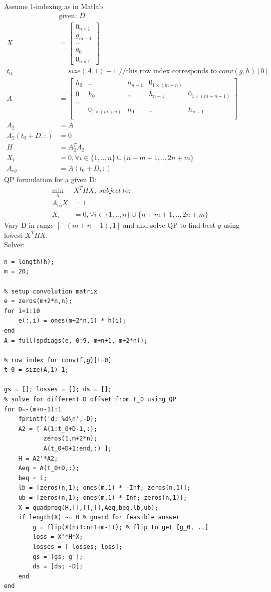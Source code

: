 \documentclass[12pt,letter]{article}
\begin{document}
\begin{enumerate}
\begin{itemize}
    Assume 1-indexing as in Matlab
    \begin{align*}
      &\text{given: } D\\
      X &=
      \begin{bmatrix}
        0_{n\times 1}\\ g_{m-1} \\ .. \\ g_{0}\\0_{n \times 1}
      \end{bmatrix}\\
      t_0 &= size(A,1)-1 \text{ //this row index corresponds to } conv(g,h)[0]\\
      A &=
      \begin{bmatrix}
        h_0 & .. & h_{n-1} & 0_{1 \times (m+n)} & \\
        0 & h_0 & .. & h_{n-1} & 0_{1 \times (m+n-1)} \\
        .. & & & &\\
        & 0_{1\times (m+n)} & h_0 & .. & h_{n-1}\\
      \end{bmatrix}\\
      A_2 &= A\\
      A_2(t_0+D,:) &= 0\\
      H &= A_2^T A_2\\
      X_i &=0, \forall i \in \{1,..,n\} \cup \{n+m+1,..,2n+m\}\\
      A_{eq}&=A(t_0+D,:)
    \end{align*}
    QP formulation for a given D:
    \begin{align*}
      \min_X & X^T H X,\ subject\ to:\\
      A_{eq}X&=1\\
      X_i &=0, \forall i \in \{1,..,n\} \cup \{n+m+1,..,2n+m\}
    \end{align*}
    Vary D in range $[-(m+n-1),1]$ and and solve QP to find best $g$ using lowest $X^THX$.\\

    \pagebreak
    Solver:
\begin{verbatim}
n = length(h);
m = 20;

% setup convolution matrix
e = zeros(m+2*n,n);
for i=1:10
    e(:,i) = ones(m+2*n,1) * h(i);    
end
A = full(spdiags(e, 0:9, m+n+1, m+2*n));

% row index for conv(f,g)[t=0]
t_0 = size(A,1)-1;

gs = []; losses = []; ds = [];
% solve for different D offset from t_0 using QP
for D=-(m+n-1):1
    fprintf('d: %d\n',-D);
    A2 = [ A(1:t_0+D-1,:);
           zeros(1,m+2*n);
           A(t_0+D+1:end,:) ];
    H = A2'*A2;
    Aeq = A(t_0+D,:);
    beq = 1;
    lb = [zeros(n,1); ones(m,1) * -Inf; zeros(n,1)];
    ub = [zeros(n,1); ones(m,1) * Inf; zeros(n,1)];
    X = quadprog(H,[],[],[],Aeq,beq,lb,ub);
    if length(X) ~= 0 % guard for feasible answer
        g = flip(X(n+1:n+1+m-1)); % flip to get [g_0, ..]
        loss = X'*H*X;
        losses = [ losses; loss];
        gs = [gs; g'];
        ds = [ds; -D];
    end
end


\end{verbatim}
\end{itemize}
\end{enumerate}
\end{document}
